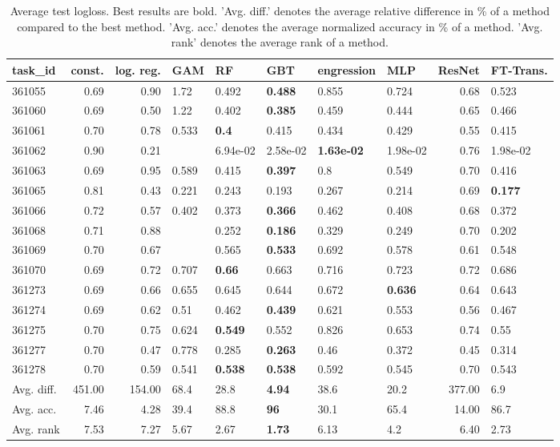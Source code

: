 \begin{table}[ht!]
\centering
\begingroup\footnotesize
\begin{tabular}{lrrlllllrl}
  \hline
\hline
task\_id & const. & log. reg. & GAM & RF & GBT & engression & MLP & ResNet & FT-Trans. \\ 
  \hline
361055 & 0.69 & 0.90 & 1.72 & 0.492 & \textbf{0.488} & 0.855 & 0.724 & 0.68 & 0.523 \\ 
  361060 & 0.69 & 0.50 & 1.22 & 0.402 & \textbf{0.385} & 0.459 & 0.444 & 0.65 & 0.466 \\ 
  361061 & 0.70 & 0.78 & 0.533 & \textbf{0.4} & 0.415 & 0.434 & 0.429 & 0.55 & 0.415 \\ 
  361062 & 0.90 & 0.21 &  & 6.94e-02 & 2.58e-02 & \textbf{1.63e-02} & 1.98e-02 & 0.76 & 1.98e-02 \\ 
  361063 & 0.69 & 0.95 & 0.589 & 0.415 & \textbf{0.397} & 0.8 & 0.549 & 0.70 & 0.416 \\ 
  361065 & 0.81 & 0.43 & 0.221 & 0.243 & 0.193 & 0.267 & 0.214 & 0.69 & \textbf{0.177} \\ 
  361066 & 0.72 & 0.57 & 0.402 & 0.373 & \textbf{0.366} & 0.462 & 0.408 & 0.68 & 0.372 \\ 
  361068 & 0.71 & 0.88 &  & 0.252 & \textbf{0.186} & 0.329 & 0.249 & 0.70 & 0.202 \\ 
  361069 & 0.70 & 0.67 &  & 0.565 & \textbf{0.533} & 0.692 & 0.578 & 0.61 & 0.548 \\ 
  361070 & 0.69 & 0.72 & 0.707 & \textbf{0.66} & 0.663 & 0.716 & 0.723 & 0.72 & 0.686 \\ 
  361273 & 0.69 & 0.66 & 0.655 & 0.645 & 0.644 & 0.672 & \textbf{0.636} & 0.64 & 0.643 \\ 
  361274 & 0.69 & 0.62 & 0.51 & 0.462 & \textbf{0.439} & 0.621 & 0.553 & 0.56 & 0.467 \\ 
  361275 & 0.70 & 0.75 & 0.624 & \textbf{0.549} & 0.552 & 0.826 & 0.653 & 0.74 & 0.55 \\ 
  361277 & 0.70 & 0.47 & 0.778 & 0.285 & \textbf{0.263} & 0.46 & 0.372 & 0.45 & 0.314 \\ 
  361278 & 0.70 & 0.59 & 0.541 & \textbf{0.538} & \textbf{0.538} & 0.592 & 0.545 & 0.70 & 0.543 \\ 
   \hline
Avg. diff. & 451.00 & 154.00 & 68.4 & 28.8 & \textbf{4.94} & 38.6 & 20.2 & 377.00 & 6.9 \\ 
  Avg. acc. & 7.46 & 4.28 & 39.4 & 88.8 & \textbf{96} & 30.1 & 65.4 & 14.00 & 86.7 \\ 
  Avg. rank & 7.53 & 7.27 & 5.67 & 2.67 & \textbf{1.73} & 6.13 & 4.2 & 6.40 & 2.73 \\ 
   \hline
\hline
\end{tabular}
\endgroup
\caption{Average test logloss. 
                  Best results are bold. 
                  'Avg. diff.' denotes the average relative difference in \% of a method compared to the best method.
                  'Avg. acc.' denotes the average normalized accuracy in \% of a method.
                  'Avg. rank' denotes the average rank of a method.} 
\label{TABLES/table_results_logloss_spatial_depth}
\end{table}
